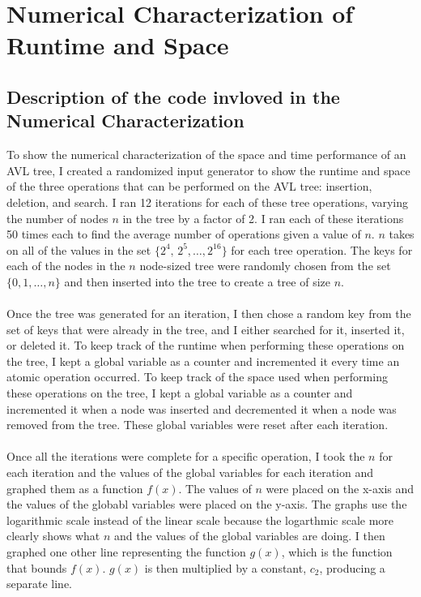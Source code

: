 \documentclass[12pt]{article}
\begin{document}
\section*{Numerical Characterization of Runtime and Space}

\subsection*{Description of the code invloved in the Numerical Characterization}
To show the numerical characterization of the space and time performance of an
AVL tree, I created a randomized input generator to show the runtime and space
of the three operations that can be performed on the AVL tree: insertion,
deletion, and search.  I ran 12 iterations for each of these tree operations,
varying the number of nodes $n$ in the tree by a factor of 2.  I ran each of
these iterations 50 times each to find the average number of operations given a
value of $n$.  $n$ takes on all of the values in the set
$\{2^4,\,2^5,\ldots,2^{16}\}$ for each tree operation.
The keys for each of the nodes in the $n$ node-sized tree were randomly chosen
from the set $\{0,1,\ldots,n\}$ and then inserted into the tree to create a
tree of size $n$.\\
\\
Once the tree was generated for an iteration, I then chose a random key
from the set of keys that were already in the tree, and I either searched for
it, inserted it, or deleted it.  To keep track of the runtime when performing
these operations on the tree, I kept a global variable as a counter and
incremented it every time an atomic operation occurred.  To keep track of the space used when
performing these operations on the tree, I kept a global variable as a counter
and incremented it when a node was inserted and decremented it when a node was
removed from the tree.  These global variables were reset after each
iteration.\\
\\
Once all the iterations were complete for a specific operation, I took the $n$
for each iteration and the values of the global variables for each iteration and
graphed them as a function $f(x)$.  The values of $n$ were placed on the
x-axis and the values of the globabl variables were placed on the y-axis.  The graphs use the logarithmic
scale instead of the linear scale because the logarthmic scale more clearly
shows what $n$ and the values of the global variables are doing.
I then graphed one other line representing the function $g(x)$, which is
the function that bounds $f(x)$. $g(x)$ is then
multiplied by a constant, $c_2$, producing a separate line.
\end{document}
